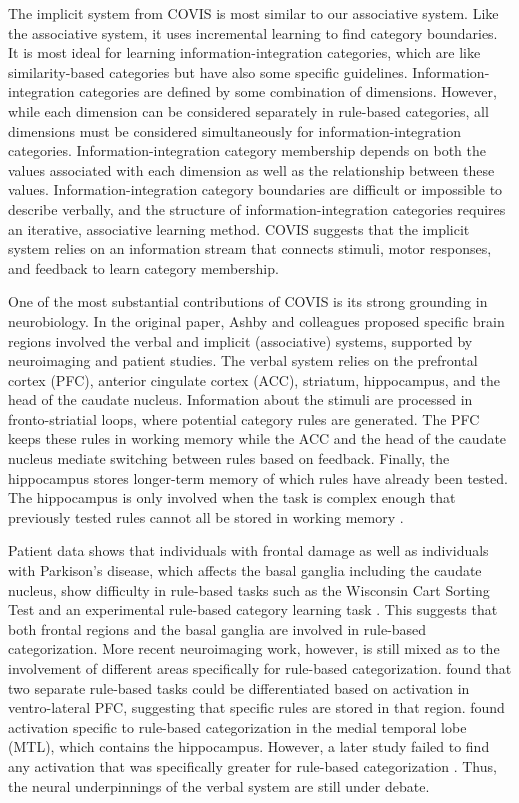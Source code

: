 \documentclass[../dissertation.tex]{subfiles}
\begin{document}
	The implicit system from COVIS is most similar to our associative system. Like the associative system, it uses incremental learning to find category boundaries. It is most ideal for learning information-integration categories, which are like similarity-based categories but have also some specific guidelines. Information-integration categories are defined by some combination of dimensions. However, while each dimension can be considered separately in rule-based categories, all dimensions must be considered simultaneously for information-integration categories. Information-integration category membership depends on both the values associated with each dimension as well as the relationship between these values. Information-integration category boundaries are difficult or impossible to describe verbally, and the structure of information-integration categories requires an iterative, associative learning method. COVIS suggests that the implicit system relies on an information stream that connects stimuli, motor responses, and feedback to learn category membership. \par
	One of the most substantial contributions of COVIS is its strong grounding in neurobiology. In the original paper, Ashby and colleagues proposed specific brain regions involved the verbal and implicit (associative) systems, supported by neuroimaging and patient studies. The verbal system relies on the prefrontal cortex (PFC), anterior cingulate cortex (ACC), striatum, hippocampus, and the head of the caudate nucleus. Information about the stimuli are processed in fronto-striatial loops, where potential category rules are generated. The PFC keeps these rules in working memory while the ACC and the head of the caudate nucleus mediate switching between rules based on feedback. Finally, the hippocampus stores longer-term memory of which rules have already been tested. The hippocampus is only involved when the task is complex enough that previously tested rules cannot all be stored in working memory \citep{Ashby2005,Ashby2011}. \par
	 Patient data shows that individuals with frontal damage as well as individuals with Parkison's disease, which affects the basal ganglia including the caudate nucleus, show difficulty in rule-based tasks such as the Wisconsin Cart Sorting Test \citep{Robinson1980} and an experimental rule-based category learning task \citep{Ashby2003b}. This suggests that both frontal regions and the basal ganglia are involved in rule-based categorization. More recent neuroimaging work, however, is still mixed as to the involvement of different areas specifically for rule-based categorization. \citet{Soto2013} found that two separate rule-based tasks could be differentiated based on activation in ventro-lateral PFC, suggesting that specific rules are stored in that region. \citet{Nomura2007} found activation specific to rule-based categorization in the medial temporal lobe (MTL), which contains the hippocampus. However, a later study failed to find any activation that was specifically greater for rule-based categorization \citep{Carpenter2016}. Thus, the neural underpinnings of the verbal system are still under debate. \par
\end{document}
